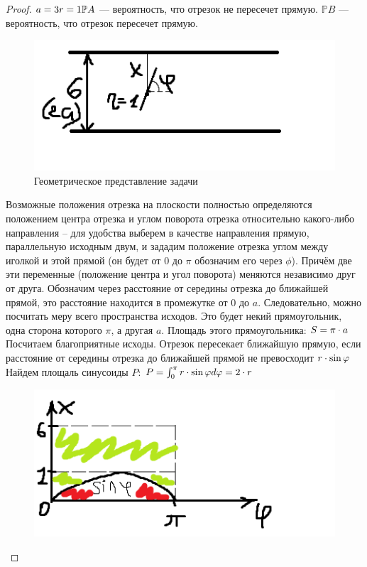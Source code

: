 \begin{proof}
$\newline a = 3\newline r = 1\newline \mathbb{P}A$ --- вероятность, что отрезок не пересечет прямую. \newline $\mathbb{P}B$ --- вероятность, что отрезок пересечет прямую. \newline
\begin{figure}[H]
    \centering
    \includegraphics[width=0.5\linewidth]{1idz_1.png}
    \caption{Геометрическое представление задачи}
\end{figure}
	Возможные положения отрезка на плоскости полностью определяются положением центра отрезка и углом поворота отрезка относительно какого-либо направления – для удобства выберем в качестве направления прямую, параллельную исходным двум, и зададим положение отрезка углом между иголкой и этой прямой (он будет от 0 до $\pi$ обозначим его через $\phi$). Причём две эти переменные (положение центра и угол поворота) меняются независимо друг от друга. Обозначим через  расстояние от середины отрезка до ближайшей прямой, это расстояние находится в промежутке от 0 до $a$. Следовательно, можно посчитать меру всего пространства исходов. Это будет некий прямоугольник, одна сторона которого $\pi$, а другая $a$. Площадь этого прямоугольника:\newline
 $S = \pi \cdot a\newline$
 Посчитаем благоприятные исходы. Отрезок пересекает ближайшую прямую, если расстояние от середины отрезка до ближайшей прямой не превосходит $r \cdot \sin{\phi}\newline$
 Найдем площаль синусоиды $P$: \newline
 $P = \int_{0}^{\pi} r \cdot \sin{\phi} d \phi = 2 \cdot r\newline$
 \begin{figure}[H]
     \centering
     \includegraphics[width=0.5\linewidth]{1швя_2.png}

\end{figure}
\end{proof}
